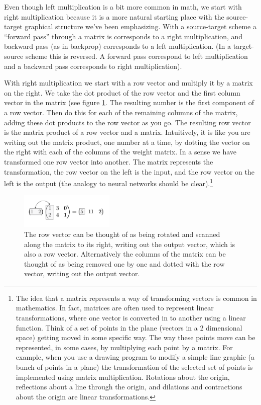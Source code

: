 Even though left multiplication is a bit more common in math, we start with right multiplication because it is a more natural starting place with the source-target graphical structure we've been emphasizing.  With a source-target scheme a  ``forward pass'' through a matrix is corresponds to a right multiplication, and backward pass (as in backprop) corresponds to a left multiplication. (In a target-source scheme this is reversed. A forward pass correspond to left multiplication and a backward pass corresponds to right multiplication).

With right multiplication we start with a row vector and multiply it by a matrix on the right. We take the dot product of the row vector and the first column vector in the matrix (see figure \ref{vectorMatrixProduct}. The resulting number is the first component of a row vector. Then do this for each of the remaining columns of the matrix, adding these dot products to the row vector as you go. The resulting row vector is the matrix product of a row vector and a matrix. Intuitively, it is like you are writing out the matrix product, one number at a time, by dotting the vector on the right with each of the columns of the weight matrix.  In a sense we have transformed one row vector into another. The matrix represents the transformation, the row vector on the left is the input, and the row vector on the left is the output (the analogy to neural networks should be clear).\footnote{The idea that a matrix represents a way of transforming vectors is common in mathematics. In fact, matrices are often used to represent linear transformations, where one vector is converted in to another using a linear function. Think of a set of points in the plane (vectors in a 2 dimensional space) getting moved in some specific way. The way these points move can be represented, in some cases, by multiplying each point by a matrix. For example, when you use a drawing program to modify a simple line graphic (a bunch of points in a plane) the transformation of the selected set of points is implemented using matrix multiplication. Rotations about the origin, reflections about a line through the origin, and dilations and contractions about the origin are linear transformations.}

\begin{figure}[h]
\centering
\includegraphics[width=0.4\textwidth]{images/vectorMatrixProduct.png}
\caption[Jeff Yoshimi.]{The row vector can be thought of as being rotated and scanned along the matrix to its right, writing out the output vector, which is also a row vector. Alternatively the columns of the matrix can be thought of as being removed one by one and dotted with the row vector, writing out the output vector.}
\label{vectorMatrixProduct}
\end{figure}


